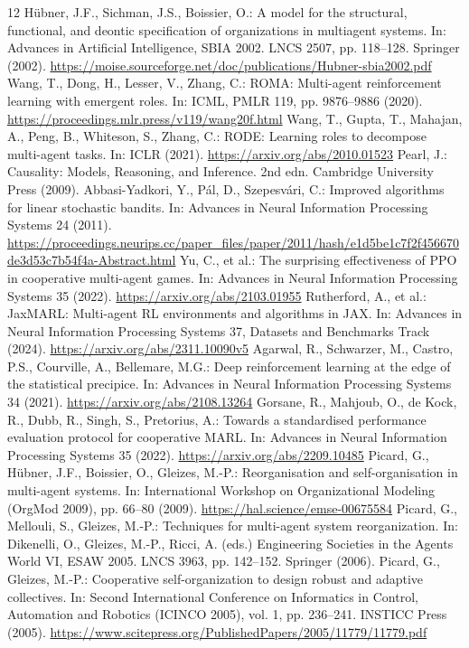 \documentclass[runningheads]{llncs}
\begin{document}
\label{body-end}
\begin{thebibliography}{12}
     H\"ubner, J.F., Sichman, J.S., Boissier, O.: A model for the structural, functional, and deontic specification of organizations in multiagent systems. In: Advances in Artificial Intelligence, SBIA 2002. LNCS 2507, pp. 118--128. Springer (2002). \url{https://moise.sourceforge.net/doc/publications/Hubner-sbia2002.pdf}
     Wang, T., Dong, H., Lesser, V., Zhang, C.: ROMA: Multi-agent reinforcement learning with emergent roles. In: ICML, PMLR 119, pp. 9876--9886 (2020). \url{https://proceedings.mlr.press/v119/wang20f.html}
     Wang, T., Gupta, T., Mahajan, A., Peng, B., Whiteson, S., Zhang, C.: RODE: Learning roles to decompose multi-agent tasks. In: ICLR (2021). \url{https://arxiv.org/abs/2010.01523}
     Pearl, J.: Causality: Models, Reasoning, and Inference. 2nd edn. Cambridge University Press (2009).
     Abbasi-Yadkori, Y., P\'al, D., Szepesv\'ari, C.: Improved algorithms for linear stochastic bandits. In: Advances in Neural Information Processing Systems 24 (2011). \url{https://proceedings.neurips.cc/paper_files/paper/2011/hash/e1d5be1c7f2f456670de3d53c7b54f4a-Abstract.html}
     Yu, C., et al.: The surprising effectiveness of PPO in cooperative multi-agent games. In: Advances in Neural Information Processing Systems 35 (2022). \url{https://arxiv.org/abs/2103.01955}
     Rutherford, A., et al.: JaxMARL: Multi-agent RL environments and algorithms in JAX. In: Advances in Neural Information Processing Systems 37, Datasets and Benchmarks Track (2024). \url{https://arxiv.org/abs/2311.10090v5}
     Agarwal, R., Schwarzer, M., Castro, P.S., Courville, A., Bellemare, M.G.: Deep reinforcement learning at the edge of the statistical precipice. In: Advances in Neural Information Processing Systems 34 (2021). \url{https://arxiv.org/abs/2108.13264}
     Gorsane, R., Mahjoub, O., de Kock, R., Dubb, R., Singh, S., Pretorius, A.: Towards a standardised performance evaluation protocol for cooperative MARL. In: Advances in Neural Information Processing Systems 35 (2022). \url{https://arxiv.org/abs/2209.10485}
     Picard, G., H\"ubner, J.F., Boissier, O., Gleizes, M.-P.: Reorganisation and self-organisation in multi-agent systems. In: International Workshop on Organizational Modeling (OrgMod 2009), pp. 66--80 (2009). \url{https://hal.science/emse-00675584}
     Picard, G., Mellouli, S., Gleizes, M.-P.: Techniques for multi-agent system reorganization. In: Dikenelli, O., Gleizes, M.-P., Ricci, A. (eds.) Engineering Societies in the Agents World VI, ESAW 2005. LNCS 3963, pp. 142--152. Springer (2006). 
     Picard, G., Gleizes, M.-P.: Cooperative self-organization to design robust and adaptive collectives. In: Second International Conference on Informatics in Control, Automation and Robotics (ICINCO 2005), vol. 1, pp. 236--241. INSTICC Press (2005). \url{https://www.scitepress.org/PublishedPapers/2005/11779/11779.pdf}
\end{thebibliography}
\end{document}
